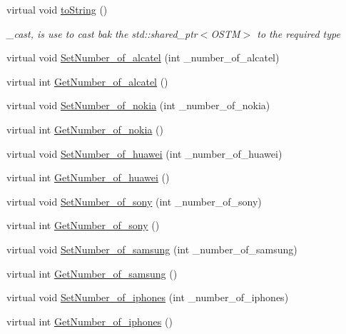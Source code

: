 \begin{DoxyCompactItemize}
virtual void \hyperlink{class_k_i_l_k_e_n_n_y___w_aea627b4c0efd0f725363556afe1ad849}{to\+String} ()
\begin{DoxyCompactList}\small\item\em \+\_\+cast, is use to cast bak the std\+::shared\+\_\+ptr$<$\+O\+S\+T\+M$>$ to the required type \end{DoxyCompactList}\item 
virtual void \hyperlink{class_k_i_l_k_e_n_n_y___w_ac4c3dbc9e74a4ae6c0a7e88d7a8f80a2}{Set\+Number\+\_\+of\+\_\+alcatel} (int \+\_\+number\+\_\+of\+\_\+alcatel)
\item 
virtual int \hyperlink{class_k_i_l_k_e_n_n_y___w_a8f23cfd2feb57a5b67f16d49c137820f}{Get\+Number\+\_\+of\+\_\+alcatel} ()
\item 
virtual void \hyperlink{class_k_i_l_k_e_n_n_y___w_a3306af7f7a306f5198c6d78e6a54bf8f}{Set\+Number\+\_\+of\+\_\+nokia} (int \+\_\+number\+\_\+of\+\_\+nokia)
\item 
virtual int \hyperlink{class_k_i_l_k_e_n_n_y___w_ad1e54597be8ac03021520caf851981e4}{Get\+Number\+\_\+of\+\_\+nokia} ()
\item 
virtual void \hyperlink{class_k_i_l_k_e_n_n_y___w_a2b89e05ada24ce0b7055f2b7cfb76e52}{Set\+Number\+\_\+of\+\_\+huawei} (int \+\_\+number\+\_\+of\+\_\+huawei)
\item 
virtual int \hyperlink{class_k_i_l_k_e_n_n_y___w_a0b0689da37856045c9325e6723f78d4b}{Get\+Number\+\_\+of\+\_\+huawei} ()
\item 
virtual void \hyperlink{class_k_i_l_k_e_n_n_y___w_a6edadc355823944f30b94039abed1c9a}{Set\+Number\+\_\+of\+\_\+sony} (int \+\_\+number\+\_\+of\+\_\+sony)
\item 
virtual int \hyperlink{class_k_i_l_k_e_n_n_y___w_a804254083a84b05b320e5723c0568e6f}{Get\+Number\+\_\+of\+\_\+sony} ()
\item 
virtual void \hyperlink{class_k_i_l_k_e_n_n_y___w_ac9ba94018b97ae9be58bde2690965612}{Set\+Number\+\_\+of\+\_\+samsung} (int \+\_\+number\+\_\+of\+\_\+samsung)
\item 
virtual int \hyperlink{class_k_i_l_k_e_n_n_y___w_ac73e56bbdb3915546b8774f260edc30e}{Get\+Number\+\_\+of\+\_\+samsung} ()
\item 
virtual void \hyperlink{class_k_i_l_k_e_n_n_y___w_abdea4a1698ad841e4d758e6b3e3bef62}{Set\+Number\+\_\+of\+\_\+iphones} (int \+\_\+number\+\_\+of\+\_\+iphones)
\item 
virtual int \hyperlink{class_k_i_l_k_e_n_n_y___w_aa8eb9ca20372744a05ab64def268a940}{Get\+Number\+\_\+of\+\_\+iphones} ()

\end{DoxyCompactItemize}
